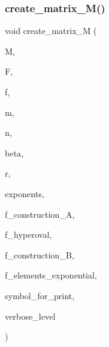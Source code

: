 \mbox{\label{tensor_8_c_ab6146bf6eb6fcdbd187f1d5ed52da649}} 
\subsubsection{\texorpdfstring{create\+\_\+matrix\+\_\+\+M()}{create\_matrix\_M()}}
{\footnotesize\ttfamily void create\+\_\+matrix\+\_\+M (\begin{DoxyParamCaption}\item[{\mbox{\hyperlink{galois_8h_a09fddde158a3a20bd2dcadb609de11dc}{I\+NT}} $\ast$\&}]{M,  }\item[{\mbox{\hyperlink{classfinite__field}{finite\+\_\+field}} $\ast$}]{F,  }\item[{\mbox{\hyperlink{classfinite__field}{finite\+\_\+field}} $\ast$}]{f,  }\item[{\mbox{\hyperlink{galois_8h_a09fddde158a3a20bd2dcadb609de11dc}{I\+NT}} \&}]{m,  }\item[{\mbox{\hyperlink{galois_8h_a09fddde158a3a20bd2dcadb609de11dc}{I\+NT}} \&}]{n,  }\item[{\mbox{\hyperlink{galois_8h_a09fddde158a3a20bd2dcadb609de11dc}{I\+NT}} \&}]{beta,  }\item[{\mbox{\hyperlink{galois_8h_a09fddde158a3a20bd2dcadb609de11dc}{I\+NT}} \&}]{r,  }\item[{\mbox{\hyperlink{galois_8h_a09fddde158a3a20bd2dcadb609de11dc}{I\+NT}} $\ast$}]{exponents,  }\item[{\mbox{\hyperlink{galois_8h_a09fddde158a3a20bd2dcadb609de11dc}{I\+NT}}}]{f\+\_\+construction\+\_\+A,  }\item[{\mbox{\hyperlink{galois_8h_a09fddde158a3a20bd2dcadb609de11dc}{I\+NT}}}]{f\+\_\+hyperoval,  }\item[{\mbox{\hyperlink{galois_8h_a09fddde158a3a20bd2dcadb609de11dc}{I\+NT}}}]{f\+\_\+construction\+\_\+B,  }\item[{\mbox{\hyperlink{galois_8h_a09fddde158a3a20bd2dcadb609de11dc}{I\+NT}}}]{f\+\_\+elements\+\_\+exponential,  }\item[{const \mbox{\hyperlink{galois_8h_ab6cc7b4aeb6ea31aba2b3fbfc83ff5e6}{B\+Y\+TE}} $\ast$}]{symbol\+\_\+for\+\_\+print,  }\item[{\mbox{\hyperlink{galois_8h_a09fddde158a3a20bd2dcadb609de11dc}{I\+NT}}}]{verbose\+\_\+level }\end{DoxyParamCaption})}

